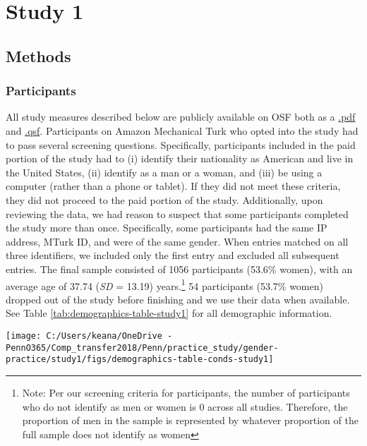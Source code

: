 \documentclass[letterpaper, nobind]{templates/ociamthesis}
\begin{document}
\newpage

\hypertarget{study-1}{%
\section{Study 1}\label{study-1}}

\hypertarget{methods}{%
\subsection{Methods}\label{methods}}

\hypertarget{participants}{%
\subsubsection{Participants}\label{participants}}

All study measures described below are publicly available on OSF both as a \href{https://osf.io/hb9nw/}{.pdf} and \href{https://osf.io/ga24t/}{.qsf}. Participants on Amazon Mechanical Turk who opted into the study had to pass several screening questions. Specifically, participants included in the paid portion of the study had to (i) identify their nationality as American and live in the United States, (ii) identify as a man or a woman, and (iii) be using a computer (rather than a phone or tablet). If they did not meet these criteria, they did not proceed to the paid portion of the study. Additionally, upon reviewing the data, we had reason to suspect that some participants completed the study more than once. Specifically, some participants had the same IP address, MTurk ID, and were of the same gender. When entries matched on all three identifiers, we included only the first entry and excluded all subsequent entries. The final sample consisted of 1056 participants (53.6\% women), with an average age of 37.74 (\emph{SD} = 13.19) years.\footnote{Note: Per our screening criteria for participants, the number of participants who do not identify as men or women is 0 across all studies. Therefore, the proportion of men in the sample is represented by whatever proportion of the full sample does not identify as women} 54 participants (53.7\% women) dropped out of the study before finishing and we use their data when available. See Table \ref{tab:demographics-table-study1} for all demographic information.

\newpage

\begin{center}\texttt{[image: C:/Users/keana/OneDrive - PennO365/Comp\_transfer2018/Penn/practice\_study/gender-practice/study1/figs/demographics-table-conds-study1]} \end{center}
\end{document}
